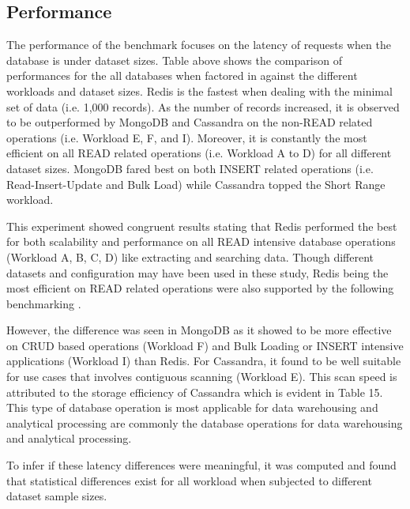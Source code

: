 \documentclass[5p]{elsarticle}
\begin{document}
\subsection{Performance}
The performance of the benchmark focuses on the latency of requests when the database is under dataset sizes.
Table above shows the comparison of performances for the all databases when factored in against the different workloads and dataset sizes. 
Redis is the fastest when dealing with the minimal set of data (i.e. 1,000 records). 
As the number of records increased, it is observed to be outperformed by MongoDB and Cassandra on the non-READ related operations (i.e. Workload E, F, and I).  
Moreover, it is constantly the most efficient on all READ related operations (i.e. Workload A to D) for all different dataset sizes. 
MongoDB fared best on both INSERT related operations (i.e. Read-Insert-Update and Bulk Load) while Cassandra topped the Short Range workload. 

This experiment showed congruent results stating that Redis performed the best for both scalability and performance on all READ intensive database operations (Workload A, B, C, D) like extracting and searching data. 
Though different datasets and configuration may have been used in these study, Redis being the most efficient on READ related operations were also supported by the following benchmarking \cite{J.Ellis2018} \cite{Altoros2018}.

However, the difference was seen in MongoDB as it showed to be more effective on CRUD based operations (Workload F) and Bulk Loading or INSERT intensive applications (Workload I) than Redis. For Cassandra, it found to be well suitable for use cases that involves contiguous scanning (Workload E). This scan speed is attributed to the storage efficiency \cite{E.Chan2016} of Cassandra which is evident in Table 15. This type of database operation is most applicable for data warehousing and analytical processing are commonly the database operations for data warehousing and analytical processing. 

To infer if these latency differences were meaningful, it was computed and found that statistical differences 
exist for all workload when subjected to different dataset sample sizes. 
\end{document}
